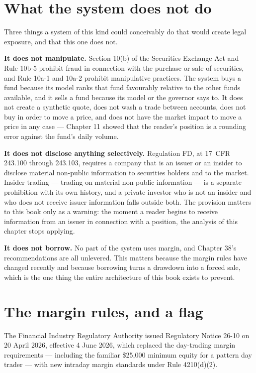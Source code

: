 \section{What the system does not do}

Three things a system of this kind could conceivably do that would
create legal exposure, and that this one does not.

\textbf{It does not manipulate.} Section 10(b) of the Securities Exchange
Act and Rule 10b-5 prohibit fraud in connection with the purchase or
sale of securities, and Rule 10a-1 and 10a-2 prohibit manipulative
practices. The system buys a fund because its model ranks that fund
favourably relative to the other funds available, and it sells a fund
because its model or the governor says to. It does not create a
synthetic quote, does not wash a trade between accounts, does not buy in
order to move a price, and does not have the market impact to move a
price in any case --- Chapter 11 showed that the reader's position is a
rounding error against the fund's daily volume.

\textbf{It does not disclose anything selectively.} Regulation FD, at
17~CFR 243.100 through 243.103, requires a company that is an issuer or
an insider to disclose material non-public information to securities
holders and to the market. Insider trading --- trading on material
non-public information --- is a separate prohibition with its own history,
and a private investor who is not an insider and who does not receive
issuer information falls outside both. The
provision matters to this book only as a warning: the moment a reader
begins to receive information from an issuer in connection with a
position, the analysis of this chapter stops applying.

\textbf{It does not borrow.} No part of the system uses margin, and
Chapter 38's recommendations are all unlevered. This matters because the
margin rules have changed recently and because borrowing turns a
drawdown into a forced sale, which is the one thing the entire architecture
of this book exists to prevent.

\section{The margin rules, and a flag}

The Financial Industry Regulatory Authority issued Regulatory Notice
26-10 on 20 April 2026, effective 4 June 2026, which replaced the
day-trading margin requirements --- including the familiar \$25,000
minimum equity for a pattern day trader --- with new intraday margin
standards under Rule 4210(d)(2).

